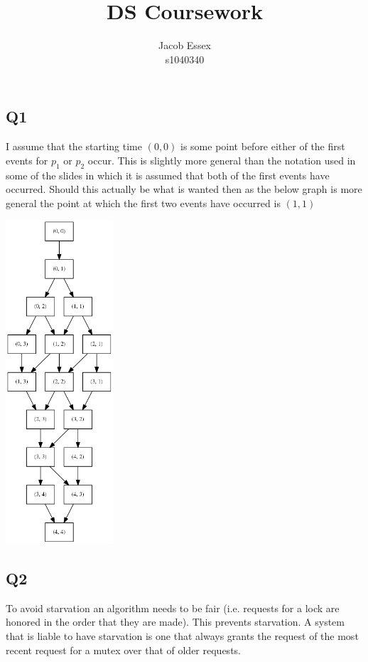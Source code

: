 \documentclass[11pt]{article}
\begin{document}
\title{DS Coursework}
\author{Jacob Essex \\ s1040340}
\maketitle

\subsection*{Q1}

I assume that the starting time $(0,0)$ is some point before either of the first events for $p_1$ or $p_2$ occur. This is slightly more general than the notation used in some of the slides in which it is assumed that both of the first events have occurred. Should this actually be what is wanted then as the below graph is more general the point at which the first two events have occurred is $(1,1)$

\includegraphics[width=0.3\textwidth]{q1_theory.png}


\subsection*{Q2}
To avoid starvation an algorithm needs to be fair (i.e. requests for a lock are honored in the order that they are made). This prevents starvation. A system that is liable to have starvation is one that always grants the request of the most recent request for a mutex over that of older requests.
\end{document}
